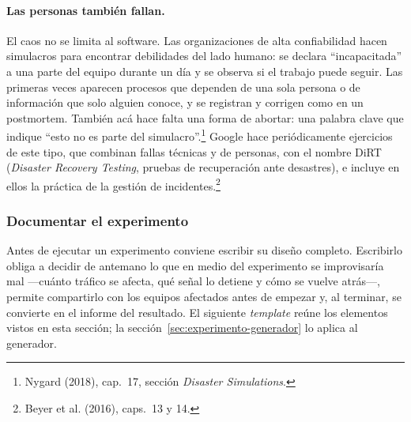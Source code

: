\documentclass[variant=apuntes,cover=institutional,mode=screen]{ua-engineering-v6-article}
\begin{document}
\paragraph{Las personas también fallan.} El caos no se limita al software. Las organizaciones de alta confiabilidad hacen simulacros para encontrar debilidades del lado humano: se declara ``incapacitada'' a una parte del equipo durante un día y se observa si el trabajo puede seguir. Las primeras veces aparecen procesos que dependen de una sola persona o de información que solo alguien conoce, y se registran y corrigen como en un postmortem. También acá hace falta una forma de abortar: una palabra clave que indique ``esto no es parte del simulacro''.\footnote{Nygard (2018), cap.~17, sección \emph{Disaster Simulations}.} Google hace periódicamente ejercicios de este tipo, que combinan fallas técnicas y de personas, con el nombre DiRT (\emph{Disaster Recovery Testing}, pruebas de recuperación ante desastres), e incluye en ellos la práctica de la gestión de incidentes.\footnote{Beyer et al. (2016), caps.~13 y 14.}

\subsubsection{Documentar el experimento}\label{sec:template-experimento}

Antes de ejecutar un experimento conviene escribir su diseño completo. Escribirlo obliga a decidir de antemano lo que en medio del experimento se improvisaría mal ---cuánto tráfico se afecta, qué señal lo detiene y cómo se vuelve atrás---, permite compartirlo con los equipos afectados antes de empezar y, al terminar, se convierte en el informe del resultado. El siguiente \emph{template} reúne los elementos vistos en esta sección; la sección~\ref{sec:experimento-generador} lo aplica al generador.
\end{document}
